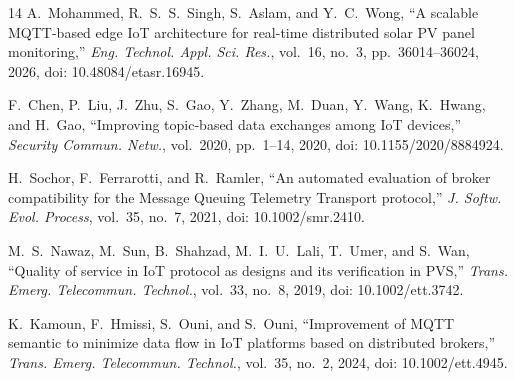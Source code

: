 \documentclass[journal]{IEEEtran}
\begin{document}
\begin{thebibliography}{14}
A.~Mohammed, R.~S.~S.~Singh, S.~Aslam, and Y.~C.~Wong,
``A scalable MQTT-based edge IoT architecture for real-time distributed solar PV panel monitoring,''
\emph{Eng. Technol. Appl. Sci. Res.}, vol.~16, no.~3, pp.~36014--36024, 2026,
doi: 10.48084/etasr.16945.

F.~Chen, P.~Liu, J.~Zhu, S.~Gao, Y.~Zhang, M.~Duan, Y.~Wang, K.~Hwang, and H.~Gao,
``Improving topic-based data exchanges among IoT devices,''
\emph{Security Commun. Netw.}, vol.~2020, pp.~1--14, 2020,
doi: 10.1155/2020/8884924.

H.~Sochor, F.~Ferrarotti, and R.~Ramler,
``An automated evaluation of broker compatibility for the Message Queuing Telemetry Transport protocol,''
\emph{J. Softw. Evol. Process}, vol.~35, no.~7, 2021,
doi: 10.1002/smr.2410.

M.~S.~Nawaz, M.~Sun, B.~Shahzad, M.~I.~U.~Lali, T.~Umer, and S.~Wan,
``Quality of service in IoT protocol as designs and its verification in PVS,''
\emph{Trans. Emerg. Telecommun. Technol.}, vol.~33, no.~8, 2019,
doi: 10.1002/ett.3742.

K.~Kamoun, F.~Hmissi, S.~Ouni, and S.~Ouni,
``Improvement of MQTT semantic to minimize data flow in IoT platforms based on distributed brokers,''
\emph{Trans. Emerg. Telecommun. Technol.}, vol.~35, no.~2, 2024,
doi: 10.1002/ett.4945.
\end{thebibliography}
\end{document}
